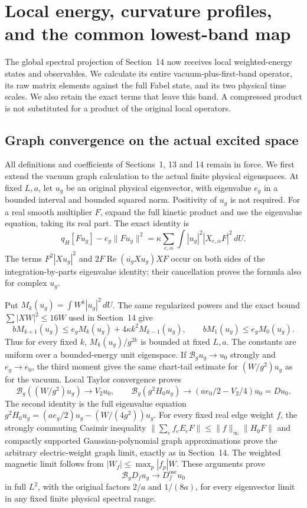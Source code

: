 \documentclass[11pt]{article}
\begin{document}
\section{Local energy, curvature profiles, and the common lowest-band map}
\label{sec:local-band}

The global spectral projection of Section~14 now receives local
weighted-energy states and observables. We calculate its entire
vacuum-plus-first-band operator, its raw matrix elements against the
full Fabel state, and its two physical time scales. We also retain the
exact terms that leave this band. A compressed product is not substituted
for a product of the original local operators.

\subsection{Graph convergence on the actual excited space}

All definitions and coefficients of Sections~1, 13 and 14 remain in
force. We first extend the vacuum graph calculation to the actual finite
physical eigenspaces. At fixed $L,a$, let $u_g$ be an original physical
eigenvector, with eigenvalue $e_g$ in a bounded interval and bounded
squared norm. Positivity of $u_g$ is not required. For a real smooth
multiplier $F$, expand the full kinetic product and use the eigenvalue
equation, taking its real part. The exact identity is
\begin{equation}\label{eq:local-excited-transform}
 q_H[Fu_g]-e_g\|Fu_g\|^2
 =\kappa\sum_{e,\alpha}\int |u_g|^2|X_{e,\alpha}F|^2\,dU.
\end{equation}
The terms $F^2|Xu_g|^2$ and $2F\operatorname{Re}(\overline{u_g}Xu_g)XF$
occur on both sides of the integration-by-parts eigenvalue identity;
their cancellation proves the formula also for complex $u_g$.

Put $M_k(u_g)=\int W^k|u_g|^2\,dU$. The same regularized powers and
the exact bound $\sum|XW|^2\le16W$ used in Section~14 give
\[
 bM_{k+1}(u_g)\le e_gM_k(u_g)+4\kappa k^2M_{k-1}(u_g),
 \qquad bM_1(u_g)\le e_gM_0(u_g).
\]
Thus for every fixed $k$, $M_k(u_g)/g^{2k}$ is bounded at fixed $L,a$.
The constants are uniform over a bounded-energy unit eigenspace.
If $\mathcal B_gu_g\to u_0$ strongly and $e_g\to e_0$,
the third moment gives the same chart-tail estimate for
$(W/g^2)u_g$ as for the vacuum. Local Taylor convergence proves
\[
 \mathcal B_g((W/g^2)u_g)\to V_2u_0,\qquad
 \mathcal B_g(g^2H_0u_g)\to
          (ae_0/2-V_2/4)u_0=Du_0 .
\]
The second identity is the full eigenvalue equation
$g^2H_0u_g=(ae_g/2)u_g-(W/(4g^2))u_g$.
For every fixed real edge weight $f$, the strongly commuting Casimir
inequality
$\|\sum_ef_eE_eF\|\le\|f\|_\infty\|H_0F\|$
and compactly supported Gaussian-polynomial graph approximations prove
the arbitrary electric-weight graph limit, exactly as in Section~14.
The weighted magnetic limit follows from
$|W_f|\le\max_p|f_p|W$. These arguments prove
\begin{equation}\label{eq:local-graph}
 \mathcal B_gD_fu_g\longrightarrow D_f^{\mathrm{osc}}u_0
\end{equation}
in full $L^2$, with the original factors $2/a$ and $1/(8a)$,
for every eigenvector limit in any fixed finite physical spectral range.
\end{document}
